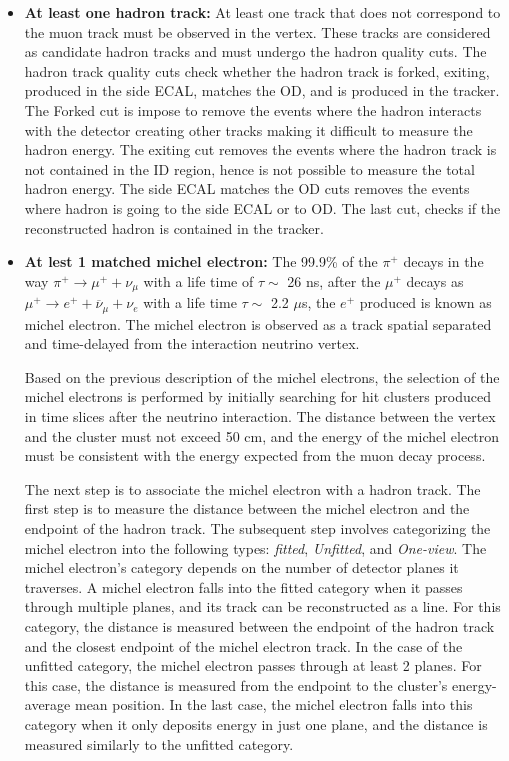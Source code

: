 \begin{itemize}
    \item \textbf{At least one hadron track:} At least one track that does not correspond to the muon track must be observed in the vertex. These tracks are considered as candidate hadron tracks and must undergo the hadron quality cuts. The hadron track quality cuts check whether the hadron track is forked, exiting, produced in the side ECAL, matches the OD, and is produced in the tracker. The Forked cut is impose to remove the events where the hadron interacts with the detector creating other tracks making it difficult to measure the hadron energy. The exiting cut removes the events where the hadron track is not contained in the ID region, hence is not possible to measure the total hadron energy. The side ECAL matches the OD cuts removes the events where hadron is going to the side ECAL or to OD. The last cut, checks if the reconstructed hadron is contained in the tracker.
    \item \textbf{At lest 1 matched michel electron:} The 99.9\% of the $\pi^+$ decays in the way $\pi^+\xrightarrow{}\mu^+ + \nu_\mu$ with a life time of $\tau \sim$ 26 ns, after the $\mu^+$ decays as $\mu^+\xrightarrow{} e^+ + \overline{\nu}_\mu + \nu_e$ with a life time $\tau\sim$ 2.2 \(\mu\)s, the $e^+$ produced is known as michel electron. The michel electron is observed as a track spatial separated and time-delayed from the interaction neutrino vertex. 

    Based on the previous description of the michel electrons, the selection of the michel electrons is performed by initially searching for hit clusters produced in time slices after the neutrino interaction. The distance between the vertex and the cluster must not exceed 50 cm, and the energy of the michel electron must be consistent with the energy expected from the muon decay process.  

    The next step is to associate the michel electron with a hadron track. The first step is to measure the distance between the michel electron and the endpoint of the hadron track. The subsequent step involves categorizing the michel electron into the following types: \textit{fitted}, \textit{Unfitted}, and \textit{One-view}. The michel electron's category depends on the number of detector planes it traverses. A michel electron falls into the fitted category when it passes through multiple planes, and its track can be reconstructed as a line. For this category, the distance is measured between the endpoint of the hadron track and the closest endpoint of the michel electron track. In the case of the unfitted category, the michel electron passes through at least 2 planes. For this case, the distance is measured from the endpoint to the cluster's energy-average mean position. In the last case, the michel electron falls into this category when it only deposits energy in just one plane, and the distance is measured similarly to the unfitted category. 


\end{itemize}
